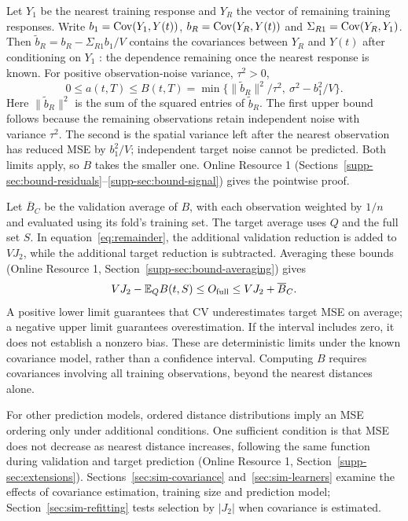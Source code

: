 Let $Y_1$ be the nearest training response and $Y_R$ the vector of remaining training responses. Write $b_1=\operatorname{Cov}(Y_1,Y(t))$, $b_R=\operatorname{Cov}(Y_R,Y(t))$ and $\Sigma_{R1}=\operatorname{Cov}(Y_R,Y_1)$. Then $\widetilde b_R=b_R-\Sigma_{R1}b_1/V$ contains the covariances between $Y_R$ and $Y(t)$ after conditioning on $Y_1$ \citep[Appendix~A.2]{rasmussen2006gpml}: the dependence remaining once the nearest response is known. For positive observation-noise variance, $\tau^2>0$,
\begin{equation}
 0\leq a(t,T)\leq B(t,T)
 =\min\{\|\widetilde b_R\|^2/\tau^2,\ \sigma^2-b_1^2/V\}.\label{eq:extra-bound}
\end{equation}
Here $\|\widetilde b_R\|^2$ is the sum of the squared entries of $\widetilde b_R$. The first upper bound follows because the remaining observations retain independent noise with variance $\tau^2$. The second is the spatial variance left after the nearest observation has reduced MSE by $b_1^2/V$; independent target noise cannot be predicted. Both limits apply, so $B$ takes the smaller one. Online Resource 1 (Sections~\ref*{supp-sec:bound-residuals}--\ref*{supp-sec:bound-signal}) gives the pointwise proof.

Let $\overline{B}_C$ be the validation average of $B$, with each observation weighted by $1/n$ and evaluated using its fold's training set. The target average uses $Q$ and the full set $S$. In equation~\eqref{eq:remainder}, the additional validation reduction is added to $VJ_2$, while the additional target reduction is subtracted. Averaging these bounds (Online Resource 1, Section~\ref*{supp-sec:bound-averaging}) gives
\begin{equation}
 VJ_2-\mathbb{E}_Q B(t,S)\leq O_{\mathrm{full}}
 \leq VJ_2+\overline B_C.\label{eq:certificate}
\end{equation}
A positive lower limit guarantees that CV underestimates target MSE on average; a negative upper limit guarantees overestimation. If the interval includes zero, it does not establish a nonzero bias. These are deterministic limits under the known covariance model, rather than a confidence interval. Computing $B$ requires covariances involving all training observations, beyond the nearest distances alone.

For other prediction models, ordered distance distributions imply an MSE ordering only under additional conditions. One sufficient condition is that MSE does not decrease as nearest distance increases, following the same function during validation and target prediction (Online Resource 1, Section~\ref*{supp-sec:extensions}). Sections~\ref{sec:sim-covariance} and~\ref{sec:sim-learners} examine the effects of covariance estimation, training size and prediction model; Section~\ref{sec:sim-refitting} tests selection by $|J_2|$ when covariance is estimated.


